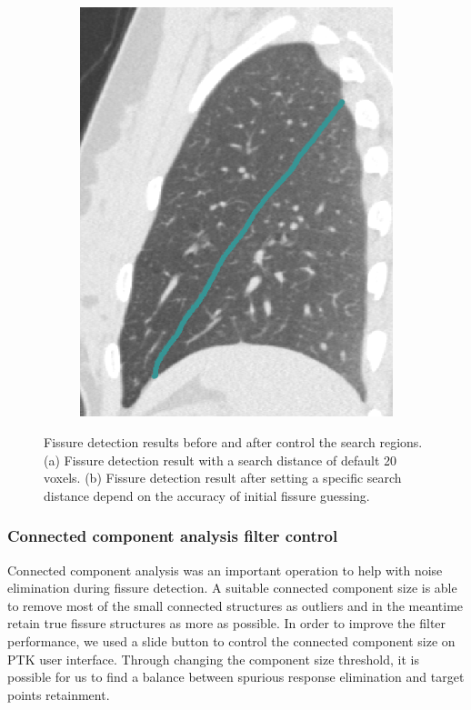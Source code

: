 {\begin{figure}[htbp]
\begin{subfigure}{.36\linewidth}
  \includegraphics[width=\linewidth,trim={{.0\wd0} {.0\wd0} {.0\wd0} {.0\wd0}},clip]{Segmentation/Image/AfterChangeSearchRegion.png}
  \caption{}
  \label{fig:SearchRegionControl-b} 
\end{subfigure}
\caption{Fissure detection results before and after control the search regions. (a) Fissure detection result with a search distance of default 20 voxels. (b) Fissure detection result after setting a specific search distance depend on the accuracy of initial fissure guessing.}
\label{fig:SearchRegionControl}
\end{figure}

\subsubsection{Connected component analysis filter control}
Connected component analysis was an important operation to help with noise elimination during fissure detection. A suitable connected component size is able to remove most of the small connected structures as outliers and in the meantime retain true fissure structures as more as possible. In order to improve the filter performance, we used a slide button to control the connected component size on PTK user interface. Through changing the component size threshold, it is possible for us to find a balance between spurious response elimination and target points retainment. 

}
